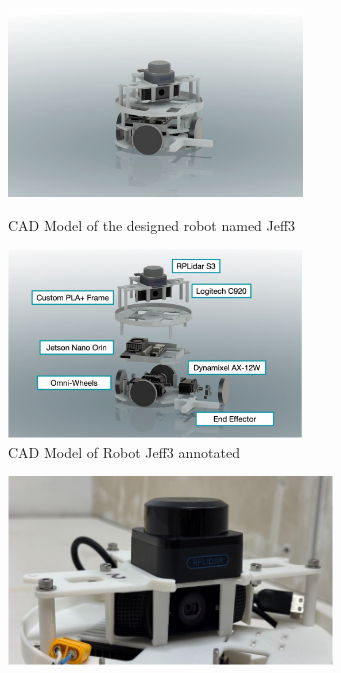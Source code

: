 \begin{figure}[!htb]
    \begin{minipage}{0.41\textwidth}
        \includegraphics[height=5cm]{assets/images/hardware/robot-model.png}
        \caption{CAD Model of the designed robot named Jeff3}
        \label{fig:robot-cad}
    \end{minipage}
    \hspace{0.1\textwidth} %
    \begin{minipage}{0.41\textwidth}
        \includegraphics[height=5cm]{assets/images/hardware/robot-exploded-annotated.png}
        \caption{CAD Model of Robot Jeff3 annotated}
        \label{fig:robot-exploded}
    \end{minipage}
\end{figure}

\begin{figure}[!htb]
    \begin{minipage}{0.41\textwidth}
        \includegraphics[height=5cm]{assets/images/hardware/irl-cameramount.jpg}
        \caption{}
        \label{fig:irl-snap-fit}
    \end{minipage}
    \hspace{0.1\textwidth} %
\end{figure}

